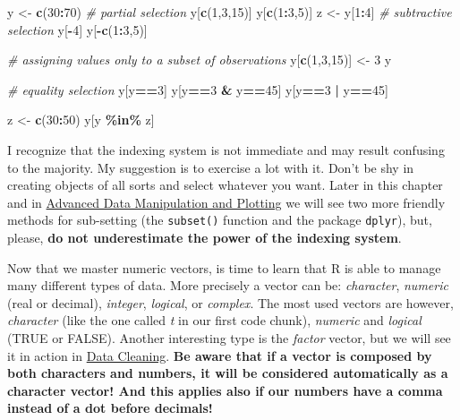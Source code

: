 \documentclass[
]{article}
\newenvironment{Shaded}{\begin{snugshade}}{\end{snugshade}}
\newcommand{\CommentTok}[1]{\textcolor[rgb]{0.56,0.35,0.01}{\textit{#1}}}
\newcommand{\DecValTok}[1]{\textcolor[rgb]{0.00,0.00,0.81}{#1}}
\newcommand{\FunctionTok}[1]{\textcolor[rgb]{0.13,0.29,0.53}{\textbf{#1}}}
\newcommand{\NormalTok}[1]{#1}
\newcommand{\OtherTok}[1]{\textcolor[rgb]{0.56,0.35,0.01}{#1}}
\newcommand{\SpecialCharTok}[1]{\textcolor[rgb]{0.81,0.36,0.00}{\textbf{#1}}}
\begin{document}
\begin{Shaded}
\begin{Highlighting}[]
\NormalTok{y }\OtherTok{\textless{}{-}} \FunctionTok{c}\NormalTok{(}\DecValTok{30}\SpecialCharTok{:}\DecValTok{70}\NormalTok{)}
\CommentTok{\# partial selection}
\NormalTok{y[}\FunctionTok{c}\NormalTok{(}\DecValTok{1}\NormalTok{,}\DecValTok{3}\NormalTok{,}\DecValTok{15}\NormalTok{)]}
\NormalTok{y[}\FunctionTok{c}\NormalTok{(}\DecValTok{1}\SpecialCharTok{:}\DecValTok{3}\NormalTok{,}\DecValTok{5}\NormalTok{)]}
\NormalTok{z }\OtherTok{\textless{}{-}}\NormalTok{ y[}\DecValTok{1}\SpecialCharTok{:}\DecValTok{4}\NormalTok{]}
\CommentTok{\# subtractive selection}
\NormalTok{y[}\SpecialCharTok{{-}}\DecValTok{4}\NormalTok{]}
\NormalTok{y[}\SpecialCharTok{{-}}\FunctionTok{c}\NormalTok{(}\DecValTok{1}\SpecialCharTok{:}\DecValTok{3}\NormalTok{,}\DecValTok{5}\NormalTok{)]}

\CommentTok{\# assigning values only to a subset of observations}
\NormalTok{y[}\FunctionTok{c}\NormalTok{(}\DecValTok{1}\NormalTok{,}\DecValTok{3}\NormalTok{,}\DecValTok{15}\NormalTok{)] }\OtherTok{\textless{}{-}} \DecValTok{3}
\NormalTok{y}

\CommentTok{\# equality selection}
\NormalTok{y[y}\SpecialCharTok{==}\DecValTok{3}\NormalTok{]}
\NormalTok{y[y}\SpecialCharTok{==}\DecValTok{3} \SpecialCharTok{\&}\NormalTok{ y}\SpecialCharTok{==}\DecValTok{45}\NormalTok{]}
\NormalTok{y[y}\SpecialCharTok{==}\DecValTok{3} \SpecialCharTok{|}\NormalTok{ y}\SpecialCharTok{==}\DecValTok{45}\NormalTok{]}

\NormalTok{z }\OtherTok{\textless{}{-}} \FunctionTok{c}\NormalTok{(}\DecValTok{30}\SpecialCharTok{:}\DecValTok{50}\NormalTok{)}
\NormalTok{y[y }\SpecialCharTok{\%in\%}\NormalTok{ z]}
\end{Highlighting}
\end{Shaded}

I recognize that the indexing system is not immediate and may result
confusing to the majority. My suggestion is to exercise a lot with it.
Don't be shy in creating objects of all sorts and select whatever you
want. Later in this chapter and in \protect\hyperlink{advanced-data-manipulation-and-plotting}{Advanced Data Manipulation and
Plotting} we will see two more friendly methods for sub-setting (the
\texttt{subset()} function and the package \texttt{dplyr}), but, please, \textbf{do not
underestimate the power of the indexing system}.

Now that we master numeric vectors, is time to learn that R is able to
manage many different types of data. More precisely a vector can be:
\emph{character}, \emph{numeric} (real or decimal), \emph{integer}, \emph{logical}, or
\emph{complex}. The most used vectors are however, \emph{character} (like the one
called \emph{t} in our first code chunk), \emph{numeric} and \emph{logical} (TRUE or
FALSE). Another interesting type is the \emph{factor} vector, but we will see
it in action in \protect\hyperlink{data-cleaning}{Data Cleaning}. \textbf{Be aware that if a vector is composed
by both characters and numbers, it will be considered automatically as a
character vector! And this applies also if our numbers have a comma
instead of a dot before decimals!}
\end{document}
